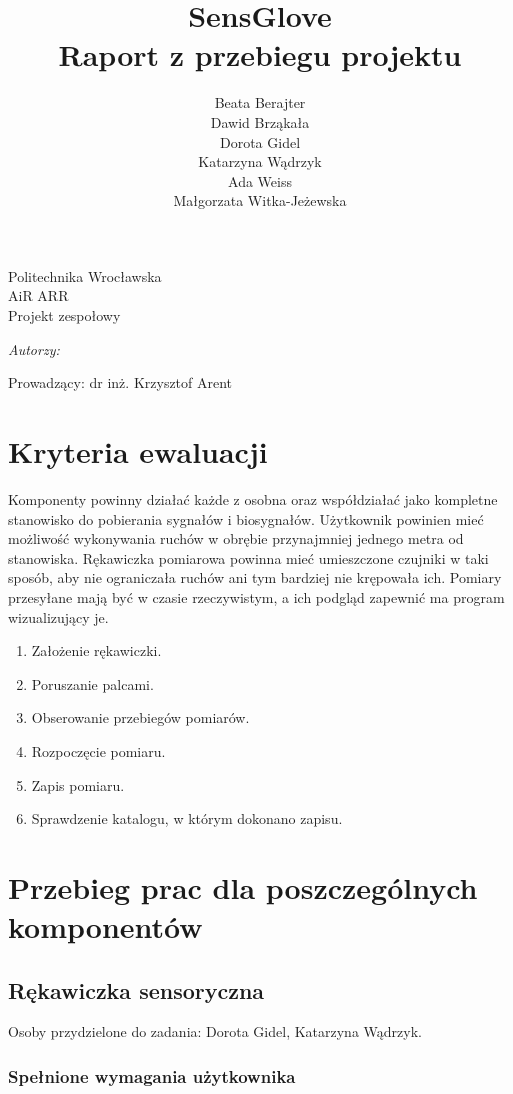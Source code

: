 \documentclass{article}
\author{Beata Berajter\\
Dawid Brząkała\\
Dorota Gidel\\
Katarzyna Wądrzyk\\
Ada Weiss\\
Małgorzata Witka-Jeżewska\\
 }
\title{SensGlove\\Raport z przebiegu projektu}
\makeatletter
\renewcommand{\maketitle}{\begin{titlepage}
    \vspace*{1cm}
    \begin{center}
    Politechnika Wrocławska\\
    AiR ARR\\
 Projekt zespołowy
    \end{center}
      \vspace{3cm}
    \begin{center}

     \LARGE \textsc {\@title}
         \end{center}
     \vspace{1cm}

    \begin{center}
    \textit{ Autorzy:}\\
   \textit{\@author}
     \end{center}
      \vspace{1cm}

     \begin{center}

    Prowadzący:
  dr inż. Krzysztof Arent
    \end{center}

    \vspace*{\stretch{6}}
    \begin{center}
    \@date
    \end{center}
  \end{titlepage}
}
\makeatother
\begin{document}
\maketitle
\newpage
\tableofcontents
\newpage



\section{Kryteria ewaluacji}
Komponenty powinny działać każde z osobna oraz współdziałać jako kompletne stanowisko do pobierania sygnałów i biosygnałów. Użytkownik powinien mieć możliwość wykonywania ruchów w obrębie przynajmniej jednego metra od stanowiska. Rękawiczka pomiarowa powinna mieć umieszczone czujniki w taki sposób, aby nie ograniczała ruchów ani tym bardziej nie krępowała ich. Pomiary przesyłane mają być w czasie rzeczywistym, a ich podgląd zapewnić ma program wizualizujący je.
\begin{enumerate}
	\item Założenie rękawiczki.
	\item Poruszanie palcami.
	\item Obserowanie przebiegów pomiarów.
	\item Rozpoczęcie pomiaru.
	\item Zapis pomiaru.
	\item Sprawdzenie katalogu, w którym dokonano zapisu.
\end{enumerate}
%
%
%
%
%
\section{Przebieg prac dla poszczególnych komponentów}
\subsection{Rękawiczka sensoryczna}
Osoby przydzielone do zadania: Dorota Gidel, Katarzyna Wądrzyk.
\subsubsection{Spełnione wymagania użytkownika}
\end{document}
